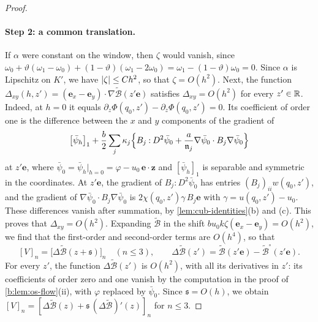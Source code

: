 \begin{proof}
\paragraph{Step 2: a common translation.} If $\alpha$ were constant on the
window, then $\zeta$ would vanish, since
$\omega_0+\vartheta(\omega_1-\omega_0)+(1-\vartheta)(\omega_1-2\omega_0)
=\omega_1-(1-\vartheta)\omega_0=0$. Since $\alpha$ is Lipschitz on
$K'$, we have $\lvert \zeta\rvert\le Ch^2$, so that $\zeta=O(h^2)$. Next, the function
$\Delta_{xy}(h,z')=(\mathbf e_x-\mathbf e_y)\cdot\nabla\widetilde{\mathcal B}(z'\mathbf e)$
satisfies $\Delta_{xy}=O(h^2)$ for every $z'\in\mathbb R$. Indeed, at $h=0$ it equals
$\partial_z\Phi(q_0,z')-\partial_z\Phi(q_0,z')=0$. Its coefficient of order one
is the difference between the $x$ and $y$ components of the gradient of
\[
 \bigl[\bar\psi_h\bigr]_1+\frac b2\sum_j\kappa_j\Bigl\{B_j\mathbin:D^2\bar\psi_0
 +\frac a{\mathfrak n_j}\nabla\bar\psi_0\cdot B_j\nabla\bar\psi_0\Bigr\}
\]
at $z'\mathbf e$, where $\bar\psi_0=\bar\psi_h|_{h=0}=\varphi-u_0\,\mathbf e\cdot\mathbf z$ and
$[\bar\psi_h]_1$ is separable and symmetric in the coordinates. At $z'\mathbf e$, the
gradient of $B_j\mathbin:D^2\bar\psi_0$ has entries $(B_j)_{ii}w(q_0,z')$, and the
gradient of $\nabla\bar\psi_0\cdot B_j\nabla\bar\psi_0$ is
$2\chi(q_0,z')\gamma\,B_j\mathbf e$ with $\gamma=u(q_0,z')-u_0$. These differences
vanish after summation, by \cref{lem:cub-identities}(b) and (c). This proves
that $\Delta_{xy}=O(h^2)$. Expanding $\widetilde{\mathcal B}$ in the shift $bu_0k\zeta(\mathbf e_x-\mathbf
e_y)=O(h^2)$, we find that the first-order and second-order terms are
$O(h^4)$, so that
\[
 [V]_n=\bigl[\Delta\widetilde{\mathcal B}(z+\mathfrak s)\bigr]_n\quad(n\le3),\qquad
 \Delta\widetilde{\mathcal B}(z')=\widetilde{\mathcal B}(z'\mathbf e)-\widetilde{\mathcal B}^\circ(z'\mathbf e).
\]
For every $z'$, the function $\Delta\widetilde{\mathcal B}(z')$ is $O(h^2)$, with all its derivatives in
$z'$: its coefficients of order zero and one vanish by the computation in the
proof of \cref{b:lem:os-flow}(ii), with $\varphi$ replaced by $\bar\psi_0$. Since
$\mathfrak s=O(h)$, we obtain $[V]_n=[\Delta\widetilde{\mathcal B}(z)+\mathfrak s\,(\Delta\widetilde{\mathcal B})'(z)]_n$ for $n\le3$.


\end{proof}
